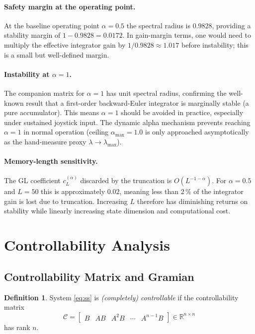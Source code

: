 \documentclass[11pt,a4paper]{article}
\theoremstyle{definition}
\newtheorem{definition}{Definition}[section]
\begin{document}
\paragraph{Safety margin at the operating point.}
At the baseline operating point $\alpha = 0.5$ the spectral radius is
$0.9828$, providing a stability margin of $1 - 0.9828 = 0.0172$.  In
gain-margin terms, one would need to multiply the effective integrator gain
by $1/0.9828 \approx 1.017$ before instability; this is a small but
well-defined margin.

\paragraph{Instability at $\alpha = 1$.}
The companion matrix for $\alpha = 1$ has unit spectral radius, confirming
the well-known result that a first-order backward-Euler integrator is
marginally stable (a pure accumulator).  This means $\alpha = 1$ should be
avoided in practice, especially under sustained joystick input.  The dynamic
alpha mechanism prevents reaching $\alpha = 1$ in normal operation
(ceiling $\alpha_{\max} = 1.0$ is only approached asymptotically as the
hand-measure proxy $\lambda \to \lambda_{\max}$).

\paragraph{Memory-length sensitivity.}
The GL coefficient $c_L^{(\alpha)}$ discarded by the truncation is
$O(L^{-1-\alpha})$.  For $\alpha = 0.5$ and $L = 50$ this is approximately
$0.02$, meaning less than 2\,\% of the integrator gain is lost due to
truncation.  Increasing $L$ therefore has diminishing returns on stability
while linearly increasing state dimension and computational cost.

\section{Controllability Analysis}
\label{sec:ctrl}

\subsection{Controllability Matrix and Gramian}

\begin{definition}
  System \eqref{eq:ss} is \emph{(completely) controllable} if the
  controllability matrix
  \begin{equation}
    \mathcal{C} = \begin{bmatrix} B & AB & A^2B & \cdots & A^{n-1}B \end{bmatrix}
    \in \mathbb{R}^{n \times n}
    \label{eq:ctrl_matrix}
  \end{equation}
  has rank $n$.
\end{definition}
\end{document}
